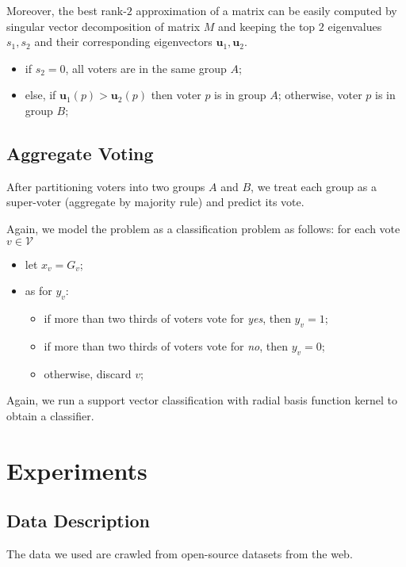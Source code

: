 \documentclass{article} %
\begin{document}
    Moreover, the best rank-$2$ approximation of a matrix can be easily computed by singular vector decomposition of matrix $M$ and keeping the top $2$ eigenvalues $s_1, s_2$ and their corresponding eigenvectors $\mathbf u_1, \mathbf u_2$.  
    \begin{itemize}
        \item if $s_2 = 0$, all voters are in the same group $A$;
        \item else, if $\mathbf u_1(p) > \mathbf u_2(p)$ then voter $p$ is in group $A$; otherwise, voter $p$ is in group $B$;
    \end{itemize}
    
\subsection{Aggregate Voting}
    After partitioning voters into two groups $A$ and $B$, we treat each group as a super-voter (aggregate by majority rule) and predict its vote.
    
    Again, we model the problem as a classification problem as follows: for each vote $v \in \mathcal V$
    \begin{itemize}
        \item let $x_v = G_v$;
        \item as for $y_v$:
            \begin{itemize}
                \item if more than two thirds of voters vote for {\em yes}, then $y_v = 1$;
                \item if more than two thirds of voters vote for {\em no}, then $y_v = 0$;
                \item otherwise, discard $v$;
            \end{itemize}
    \end{itemize}
 
    Again, we run a support vector classification with radial basis function kernel to obtain a classifier.
    
\section{Experiments}

\subsection{Data Description}
     The data we used are crawled from open-source datasets from the web. %
     
\end{document}
